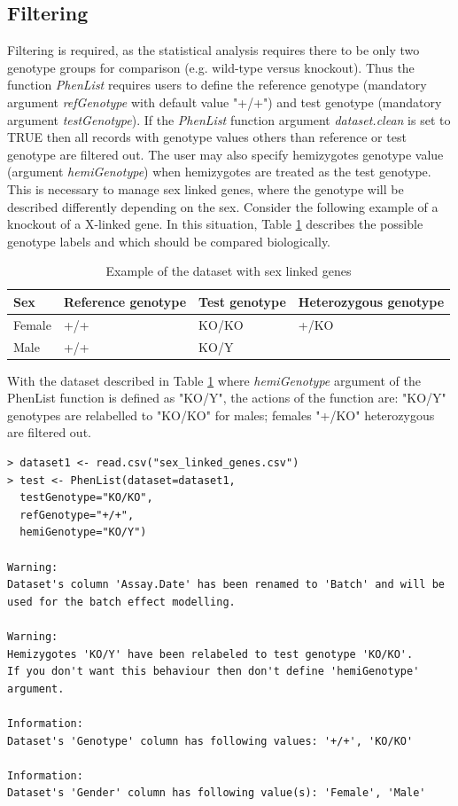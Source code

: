 \documentclass[12pt,a4paper]{article}
\begin{document}
\subsection{Filtering}
\label{section:Filtering}
Filtering is required, as the statistical analysis requires there to be only two genotype groups for comparison (e.g. wild-type versus knockout). Thus the function \textit{PhenList} requires users to define the reference genotype (mandatory argument \textit{refGenotype} with default value "+\slash+") and test genotype (mandatory argument \textit{testGenotype}). 
If the \textit{PhenList} function argument \textit{dataset.clean} is set to TRUE then all records with genotype values others than reference or test genotype are filtered out. 
The user may also specify hemizygotes genotype value (argument \textit{hemiGenotype}) when hemizygotes are treated as the test genotype. 
This is necessary to manage sex linked genes, where the genotype will be described differently depending on the sex. 
Consider the following example of a knockout of a X-linked gene. In this situation, Table \ref{table:03} describes the possible genotype labels and which should be compared biologically.
\begin{table}[!h]
\begin{center}
\begin{tabular}{| l | l | l | l |}
  \hline
Sex&Reference genotype&Test genotype&Heterozygous genotype\\\hline
Female&+\slash +&KO\slash KO&+\slash KO\\
Male&+\slash +&KO\slash Y& \\
\hline  
\end{tabular}
\caption{Example of the dataset with sex linked genes}\label{table:03}
\end{center}
\end{table}

With the dataset described in Table \ref{table:03} where \textit{hemiGenotype} argument of the PhenList function is defined as "KO\slash Y", the actions of the function are:  "KO/Y" genotypes are relabelled to "KO/KO" for males;  females "+\slash KO" heterozygous are filtered out. 

\begingroup
    \fontsize{8pt}{12pt}\selectfont
\begin{verbatim}
> dataset1 <- read.csv("sex_linked_genes.csv")
> test <- PhenList(dataset=dataset1,
  testGenotype="KO/KO",
  refGenotype="+/+",
  hemiGenotype="KO/Y")
  
Warning:
Dataset's column 'Assay.Date' has been renamed to 'Batch' and will be used for the batch effect modelling.

Warning:
Hemizygotes 'KO/Y' have been relabeled to test genotype 'KO/KO'.
If you don't want this behaviour then don't define 'hemiGenotype' argument.

Information:
Dataset's 'Genotype' column has following values: '+/+', 'KO/KO'

Information:
Dataset's 'Gender' column has following value(s): 'Female', 'Male'
\end{verbatim}
\endgroup
\end{document}
